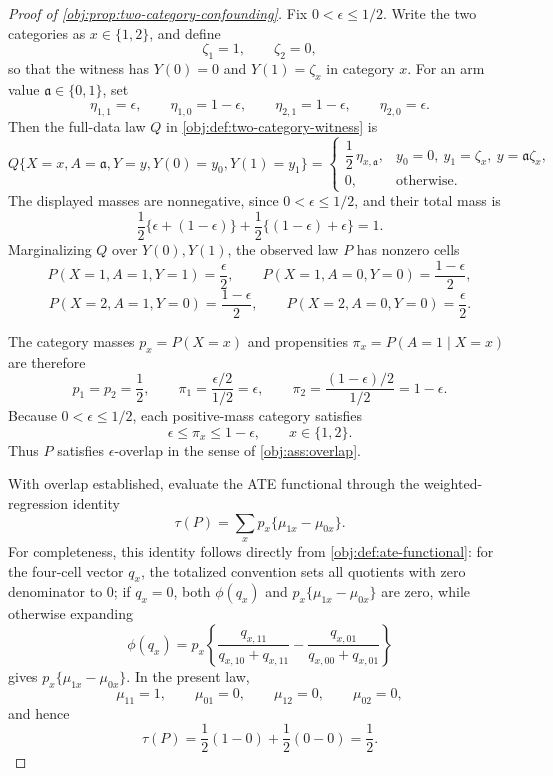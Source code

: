 \begin{proof}[Proof of \cref{obj:prop:two-category-confounding}]
Fix \(0<\epsilon\le 1/2\).  Write the two categories as \(x\in\{1,2\}\), and define
\[
\zeta_1=1,\qquad \zeta_2=0,
\]
so that the witness has \(Y(0)=0\) and \(Y(1)=\zeta_x\) in category \(x\).  For an arm value \(\mathfrak a\in\{0,1\}\), set
\[
\eta_{1,1}=\epsilon,\qquad
\eta_{1,0}=1-\epsilon,\qquad
\eta_{2,1}=1-\epsilon,\qquad
\eta_{2,0}=\epsilon .
\]
Then the full-data law \(Q\) in \cref{obj:def:two-category-witness} is
\[
Q\{X=x,A=\mathfrak a,Y=y,Y(0)=y_0,Y(1)=y_1\}
=
\begin{cases}
\dfrac12\,\eta_{x,\mathfrak a},
&
y_0=0,\ y_1=\zeta_x,\ y=\mathfrak a\zeta_x,\\[1ex]
0,& \text{otherwise.}
\end{cases}
\]
The displayed masses are nonnegative, since \(0<\epsilon\le1/2\), and their total mass is
\[
\frac12\{\epsilon+(1-\epsilon)\}
+
\frac12\{(1-\epsilon)+\epsilon\}
=1.
\]
Marginalizing \(Q\) over \(Y(0),Y(1)\), the observed law \(P\) has nonzero cells
\[
P(X=1,A=1,Y=1)=\frac{\epsilon}{2},\qquad
P(X=1,A=0,Y=0)=\frac{1-\epsilon}{2},
\]
\[
P(X=2,A=1,Y=0)=\frac{1-\epsilon}{2},\qquad
P(X=2,A=0,Y=0)=\frac{\epsilon}{2}.
\]

The category masses \(p_x=P(X=x)\) and propensities \(\pi_x=P(A=1\mid X=x)\) are therefore
\[
p_1=p_2=\frac12,\qquad
\pi_1=\frac{\epsilon/2}{1/2}=\epsilon,\qquad
\pi_2=\frac{(1-\epsilon)/2}{1/2}=1-\epsilon .
\]
Because \(0<\epsilon\le1/2\), each positive-mass category satisfies
\[
\epsilon\le \pi_x\le 1-\epsilon,\qquad x\in\{1,2\}.
\]
Thus \(P\) satisfies \(\epsilon\)-overlap in the sense of \cref{obj:ass:overlap}.

With overlap established, evaluate the ATE functional through the weighted-regression identity
\[
\tau(P)=\sum_x p_x\{\mu_{1x}-\mu_{0x}\}.
\]
For completeness, this identity follows directly from \cref{obj:def:ate-functional}: for the four-cell vector \(q_x\), the totalized convention sets all quotients with zero denominator to \(0\); if \(q_x=0\), both \(\phi(q_x)\) and \(p_x\{\mu_{1x}-\mu_{0x}\}\) are zero, while otherwise expanding
\[
\phi(q_x)
=
p_x\left\{
\frac{q_{x,11}}{q_{x,10}+q_{x,11}}
-
\frac{q_{x,01}}{q_{x,00}+q_{x,01}}
\right\}
\]
gives \(p_x\{\mu_{1x}-\mu_{0x}\}\).  In the present law,
\[
\mu_{11}=1,\qquad \mu_{01}=0,\qquad
\mu_{12}=0,\qquad \mu_{02}=0,
\]
and hence
\[
\tau(P)
=
\frac12(1-0)+\frac12(0-0)
=
\frac12 .
\]


\end{proof}
